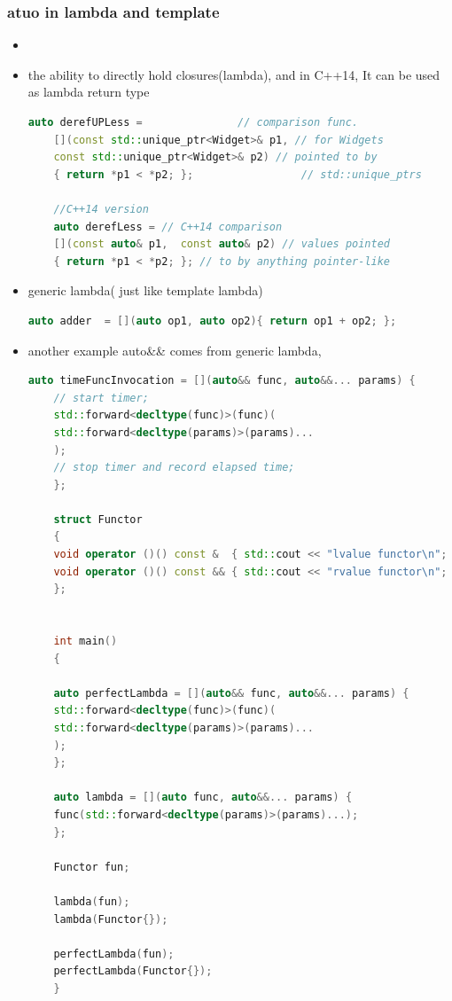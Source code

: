 \documentclass[a4paper,12pt,twoside]{book}
\begin{document}
\subsubsection{atuo in lambda and template}
\begin{itemize}
	\item \item the ability to directly hold closures(lambda), and in C++14, It can be used as lambda return type
	\begin{lstlisting}[frame=single, language=c++]
	auto derefUPLess =               // comparison func.
	[](const std::unique_ptr<Widget>& p1, // for Widgets
	const std::unique_ptr<Widget>& p2) // pointed to by
	{ return *p1 < *p2; };                 // std::unique_ptrs
	
	//C++14 version
	auto derefLess = // C++14 comparison
	[](const auto& p1,  const auto& p2) // values pointed
	{ return *p1 < *p2; }; // to by anything pointer-like
	\end{lstlisting}
	
		\item generic lambda( just like template lambda)
	\begin{lstlisting}[frame=single, language=c++]
	auto adder  = [](auto op1, auto op2){ return op1 + op2; };
	\end{lstlisting}
	
	\item another example auto\&\& comes from generic lambda, 
	\begin{lstlisting}[frame=single, language=c++]
	auto timeFuncInvocation = [](auto&& func, auto&&... params) {
	// start timer;
	std::forward<decltype(func)>(func)(
	std::forward<decltype(params)>(params)...
	);
	// stop timer and record elapsed time;
	};
	
	struct Functor
	{
	void operator ()() const &  { std::cout << "lvalue functor\n"; }
	void operator ()() const && { std::cout << "rvalue functor\n"; }
	};
	
	
	int main()
	{
	
	auto perfectLambda = [](auto&& func, auto&&... params) {
	std::forward<decltype(func)>(func)(
	std::forward<decltype(params)>(params)...
	);
	};
	
	auto lambda = [](auto func, auto&&... params) {
	func(std::forward<decltype(params)>(params)...);
	};
	
	Functor fun;
	
	lambda(fun);
	lambda(Functor{});
	
	perfectLambda(fun);
	perfectLambda(Functor{});
	}
	\end{lstlisting}
	

\end{itemize}
\end{document}
